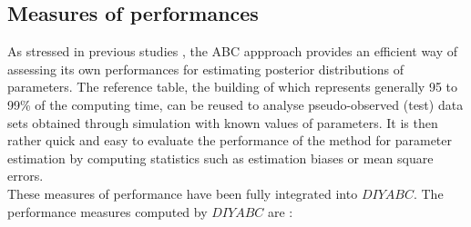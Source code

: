 \subsection{Measures of performances}
As stressed in previous studies \citep[e.g.][]{Ex2005}, the ABC appproach provides an efficient way of assessing its own performances for estimating posterior distributions of parameters. The reference table, the building of which represents generally 95 to 99\% of the computing time, can be reused to analyse pseudo-observed (test) data sets obtained through simulation with known values of parameters. It is then rather quick and easy to evaluate the performance of the method for parameter estimation by computing statistics such as estimation biases or mean square errors.\\
These measures of performance have been fully integrated into $DIYABC$. The performance measures computed by $DIYABC$ are :
